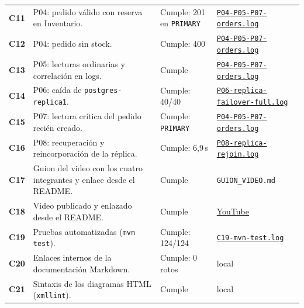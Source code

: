 \documentclass[
  spanish,
  a4paper,
  11pt
]{article}
\newcommand{\evid}[1]{\href{https://github.com/yan2005dris-afk/SDCC---microservices-with-gateway-and-loadbalancer/blob/develop/docs/evidencias/#1}{{\urlstyle{tt}\nolinkurl{#1}}}}
\begin{document}
{\begin{longtable}{>{\bfseries}p{} >{\raggedright\arraybackslash}p{} >{\raggedright\arraybackslash}p{} >{\raggedright\arraybackslash}p{}}
C11 & P04: pedido válido con reserva en Inventario. & Cumple: 201 en \texttt{PRIMARY} & \evid{P04-P05-P07-orders.log} \\
C12 & P04: pedido sin stock. & Cumple: 400 & \evid{P04-P05-P07-orders.log} \\
C13 & P05: lecturas ordinarias y correlación en logs. & Cumple & \evid{P04-P05-P07-orders.log} \\
C14 & P06: caída de \texttt{postgres-replica1}. & Cumple: 40/40 & \evid{P06-replica-failover-full.log} \\
C15 & P07: lectura crítica del pedido recién creado. & Cumple: \texttt{PRIMARY} & \evid{P04-P05-P07-orders.log} \\
C16 & P08: recuperación y reincorporación de la réplica. & Cumple: 6,9\,s & \evid{P08-replica-rejoin.log} \\
C17 & Guion del video con los cuatro integrantes y enlace desde el README. & Cumple & \texttt{GUION\_VIDEO.md} \\
C18 & Video publicado y enlazado desde el README. & Cumple & \href{https://youtu.be/Hf0oJhigeFc}{YouTube} \\
C19 & Pruebas automatizadas (\texttt{mvn test}). & Cumple: 124/124 & \evid{C19-mvn-test.log} \\
C20 & Enlaces internos de la documentación Markdown. & Cumple: 0 rotos & local \\
C21 & Sintaxis de los diagramas HTML (\texttt{xmllint}). & Cumple & local \\
\bottomrule
\end{longtable}
}
\end{document}
